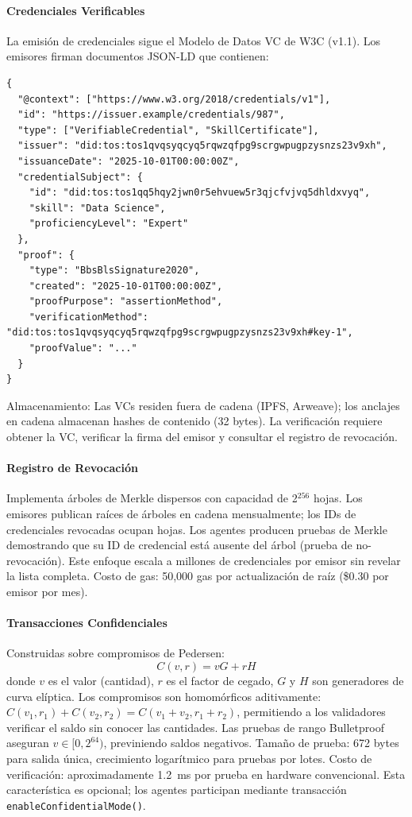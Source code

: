 \documentclass[11pt]{article}
\begin{document}
\paragraph{Credenciales Verificables} La emisión de credenciales sigue el Modelo de Datos VC de W3C (v1.1). Los emisores firman documentos JSON-LD que contienen:
\begin{verbatim}
{
  "@context": ["https://www.w3.org/2018/credentials/v1"],
  "id": "https://issuer.example/credentials/987",
  "type": ["VerifiableCredential", "SkillCertificate"],
  "issuer": "did:tos:tos1qvqsyqcyq5rqwzqfpg9scrgwpugpzysnzs23v9xh",
  "issuanceDate": "2025-10-01T00:00:00Z",
  "credentialSubject": {
    "id": "did:tos:tos1qq5hqy2jwn0r5ehvuew5r3qjcfvjvq5dhldxvyq",
    "skill": "Data Science",
    "proficiencyLevel": "Expert"
  },
  "proof": {
    "type": "BbsBlsSignature2020",
    "created": "2025-10-01T00:00:00Z",
    "proofPurpose": "assertionMethod",
    "verificationMethod": "did:tos:tos1qvqsyqcyq5rqwzqfpg9scrgwpugpzysnzs23v9xh#key-1",
    "proofValue": "..."
  }
}
\end{verbatim}
Almacenamiento: Las VCs residen fuera de cadena (IPFS, Arweave); los anclajes en cadena almacenan hashes de contenido (32 bytes). La verificación requiere obtener la VC, verificar la firma del emisor y consultar el registro de revocación.

\paragraph{Registro de Revocación} Implementa árboles de Merkle dispersos con capacidad de 2$^{256}$ hojas. Los emisores publican raíces de árboles en cadena mensualmente; los IDs de credenciales revocadas ocupan hojas. Los agentes producen pruebas de Merkle demostrando que su ID de credencial está ausente del árbol (prueba de no-revocación). Este enfoque escala a millones de credenciales por emisor sin revelar la lista completa. Costo de gas: 50,000 gas por actualización de raíz (\$0.30 por emisor por mes).

\paragraph{Transacciones Confidenciales} Construidas sobre compromisos de Pedersen:
\begin{equation}
C(v, r) = vG + rH
\end{equation}
donde $v$ es el valor (cantidad), $r$ es el factor de cegado, $G$ y $H$ son generadores de curva elíptica. Los compromisos son homomórficos aditivamente: $C(v_1, r_1) + C(v_2, r_2) = C(v_1 + v_2, r_1 + r_2)$, permitiendo a los validadores verificar el saldo sin conocer las cantidades. Las pruebas de rango Bulletproof aseguran $v \in [0, 2^{64})$, previniendo saldos negativos. Tamaño de prueba: 672 bytes para salida única, crecimiento logarítmico para pruebas por lotes. Costo de verificación: aproximadamente 1.2~ms por prueba en hardware convencional. Esta característica es opcional; los agentes participan mediante transacción \texttt{enableConfidentialMode()}.
\end{document}

